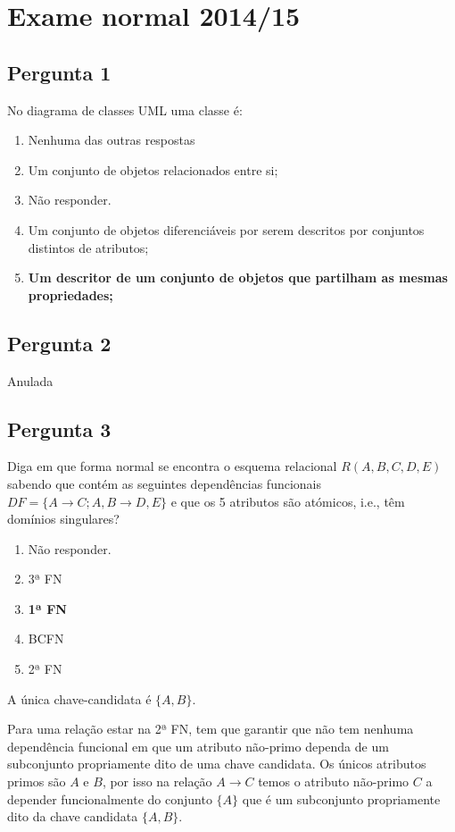 {
\renewcommand{\thechapter}{\arabic{chapter}N}
\setcounter{chapter}{14}
\chapter{Exame normal 2014/15}

\section{Pergunta 1} 
No diagrama de classes UML uma classe é:
\begin{enumerate}[label=\alph*.]\itemsep0em
    \item Nenhuma das outras respostas
    \item Um conjunto de objetos relacionados entre si;
    \item Não responder.
    \item Um conjunto de objetos diferenciáveis por serem descritos por conjuntos distintos de atributos;
    \item \textbf{Um descritor de um conjunto de objetos que partilham as mesmas propriedades; \greencheckmark}
\end{enumerate}

\section{Pergunta 2}
Anulada

\section{Pergunta 3}
Diga em que forma normal se encontra o esquema relacional $R(A,B,C,D,E)$ sabendo que contém as seguintes dependências funcionais $DF=\{A \rightarrow C; A,B \rightarrow D,E\}$ e que os 5 atributos são atómicos, i.e., têm domínios singulares?
\begin{enumerate}[label=\alph*.]\itemsep0em
    \item Não responder.
    \item 3ª FN
    \item \textbf{1ª FN \greencheckmark}
    \item BCFN
    \item 2ª FN
\end{enumerate}
A única chave-candidata é $\{A,B\}$.

Para uma relação estar na 2ª FN, tem que garantir que não tem nenhuma dependência funcional em que um atributo não-primo dependa de um subconjunto propriamente dito de uma chave candidata. Os únicos atributos primos são $A$ e $B$, por isso na relação $A \rightarrow C$ temos o atributo não-primo $C$ a depender funcionalmente do conjunto $\{A\}$ que é um subconjunto propriamente dito da chave candidata $\{A,B\}$.

}
